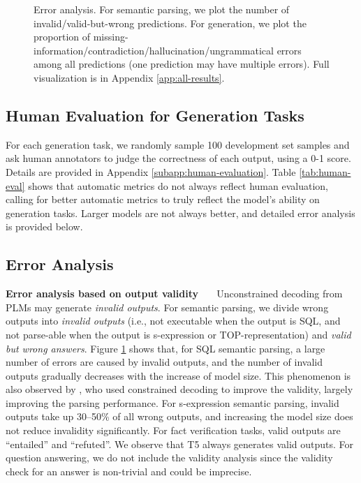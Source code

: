 \begin{figure}[t]
\centering
\caption{\label{fig:error-analysis} Error analysis. For semantic parsing, we plot the number of invalid/valid-but-wrong predictions. For generation, we plot the proportion of missing-information/contradiction/hallucination/ungrammatical errors among all predictions (one prediction may have multiple errors). Full visualization is in Appendix \ref{app:all-results}. } 
\end{figure}

\subsection{Human Evaluation for Generation Tasks}
\label{subsec:human-eval}
For each generation task, we randomly sample 100 development set samples and ask human annotators to judge the correctness of each output, using a 0-1 score. Details are provided in Appendix \ref{subapp:human-evaluation}. 
Table \ref{tab:human-eval} shows that automatic metrics do not always reflect human evaluation, calling for better automatic metrics to truly reflect the model's ability on generation tasks. 
Larger models are not always better, and detailed error analysis is provided below. 

\subsection{Error Analysis}
\label{subsec:error}

\noindent\textbf{Error analysis based on output validity \ \ }  
Unconstrained decoding from PLMs may generate \textit{invalid outputs}. 
For semantic parsing, we divide wrong outputs into \textit{invalid outputs} (i.e., not executable when the output is SQL, and not parse-able when the output is s-expression or TOP-representation) and \textit{valid but wrong answers}. 
Figure \ref{fig:error-analysis} shows that, for SQL semantic parsing, a large number of errors are caused by invalid outputs, and the number of invalid outputs gradually decreases with the increase of model size. This phenomenon is also observed by \citet{Scholak2021:PICARD}, who used constrained decoding to improve the validity, largely improving the parsing performance.
For s-expression semantic parsing, invalid outputs take up 30--50\% of all wrong outputs, and increasing the model size does not reduce invalidity significantly. 
For fact verification tasks, valid outputs are ``entailed'' and ``refuted''. 
We observe that T5 always generates valid outputs. 
For question answering, we do not include the validity analysis since the validity check for an answer is non-trivial and could be imprecise. 

